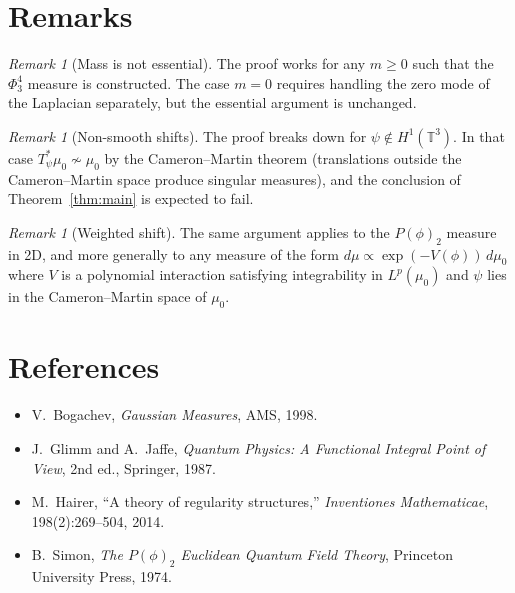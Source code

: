 \documentclass[12pt]{article}
\theoremstyle{definition}
\theoremstyle{remark}
\newtheorem{remark}[theorem]{Remark}
\begin{document}
\section{Remarks}

\begin{remark}[Mass is not essential]
The proof works for any $m\ge0$ such that the $\Phi^4_3$ measure is
constructed.  The case $m=0$ requires handling the zero mode of the Laplacian
separately, but the essential argument is unchanged.
\end{remark}

\begin{remark}[Non-smooth shifts]
The proof breaks down for $\psi\notin H^1(\mathbb{T}^3)$.  In that case
$T_\psi^*\mu_0\not\sim\mu_0$ by the Cameron--Martin theorem
(translations outside the Cameron--Martin space produce singular measures),
and the conclusion of Theorem~\ref{thm:main} is expected to fail.
\end{remark}

\begin{remark}[Weighted shift]
The same argument applies to the $P(\phi)_2$ measure in 2D, and more
generally to any measure of the form $d\mu\propto\exp(-V(\phi))\,d\mu_0$
where $V$ is a polynomial interaction satisfying integrability in $L^p(\mu_0)$
and $\psi$ lies in the Cameron--Martin space of $\mu_0$.
\end{remark}

\section*{References}

\begin{itemize}
\item V.~Bogachev, \emph{Gaussian Measures}, AMS, 1998.
\item J.~Glimm and A.~Jaffe, \emph{Quantum Physics: A Functional Integral
  Point of View}, 2nd ed., Springer, 1987.
\item M.~Hairer, ``A theory of regularity structures,''
  \emph{Inventiones Mathematicae}, 198(2):269--504, 2014.
\item B.~Simon, \emph{The $P(\phi)_2$ Euclidean Quantum Field Theory},
  Princeton University Press, 1974.
\end{itemize}
\end{document}
